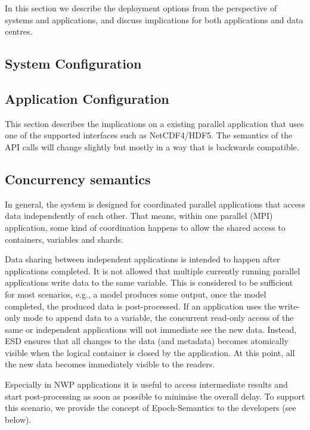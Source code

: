 In this section we describe the deployment options from the perspective of
systems and applications, and discuss implications for both applications and
data centres.

\subsection{System Configuration}


\subsection{Application Configuration}


This section describes the implications on a existing parallel application that uses one of the supported interfaces such as NetCDF4/HDF5.
The semantics of the API calls will change slightly but mostly in a way that is backwards compatible.



\subsection{Concurrency semantics}

In general, the system is designed for coordinated parallel applications that access data independently of each other.
That means, within one parallel (MPI) application, some kind of coordination happens to allow the shared access to containers, variables and shards.

Data sharing between independent applications is intended to happen after applications completed.
It is not allowed that multiple currently running parallel applications write data to the same variable.
This is considered to be sufficient for most scenarios, e.g., a model produces some output, once the model completed, the produced data is post-processed.
If an application uses the write-only mode to append data to a variable, the concurrent read-only access of the same or independent applications will not immediate see the new data.
Instead, ESD ensures that all changes to the data (and metadata) becomes atomically visible when the logical container is closed by the application.
At this point, all the new data becomes immediately visible to the readers.

Especially in NWP applications it is useful to access intermediate results and start post-processing as soon as possible to minimise the overall delay.
To support this scenario, we provide the concept of Epoch-Semantics to the developers (see below).

